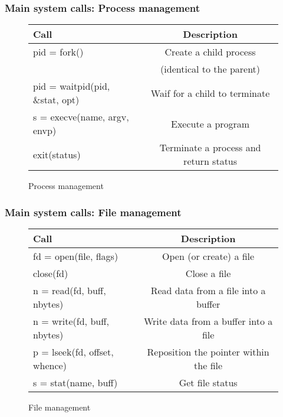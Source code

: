 \begin{frame}
  \frametitle{Main system calls: Process management}
  \begin{figure}
    \centering
    \begin{tabular}{l|c}
      Call                  & Description \\ \hline
      {\scriptsize pid = fork()}          & Create a child process \\ & (identical to the parent) \\ \hline
      {\scriptsize pid = waitpid(pid, \&stat, opt)} &  Waif for a child to terminate \\ \hline
      {\scriptsize s = execve(name, argv, envp)} & Execute a program \\ \hline
      {\scriptsize exit(status)} & Terminate a process and return status \\ \hline
    \end{tabular}
    \caption{Process management}
    \label{fig:sys-call_process}
  \end{figure}
\end{frame}

\begin{frame}
  \frametitle{Main system calls: File management}
  \begin{figure}
    \centering
    \begin{tabular}{l|c}
      Call                  & Description \\ \hline
      {\scriptsize fd = open(file, flags)}          & Open (or create) a file \\ \hline
      {\scriptsize close(fd)} &  Close a file \\ \hline
      {\scriptsize n = read(fd, buff, nbytes)} & Read data from a file into a buffer \\ \hline
      {\scriptsize n = write(fd, buff, nbytes)} & Write data from a buffer into a file \\ \hline
      {\scriptsize p = lseek(fd, offset, whence)} & Reposition the pointer within the file \\ \hline
      {\scriptsize s = stat(name, buff)} & Get file status \\ \hline
    \end{tabular}
    \caption{File management}
    \label{fig:sys-call_file}
  \end{figure}
\end{frame}

